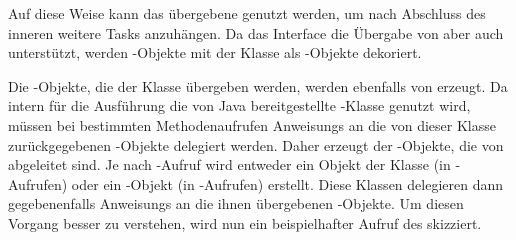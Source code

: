 Auf diese Weise kann das übergebene \classCompletableFuture{} genutzt werden, um nach Abschluss des inneren \classCallable{} weitere Tasks anzuhängen.
Da das Interface \classExecutorService{} die Übergabe von \classRunnable{} aber auch \classCallable{} unterstützt, werden \classRunnable{}-Objekte mit der Klasse \classRunnableCallable{} als \classCallable{}-Objekte dekoriert.  

Die \classCompletableFuture{}-Objekte, die der Klasse \classCompletingCallable{} übergeben werden, werden ebenfalls von \classCompletableFutureWrapper{} erzeugt. Da intern für die Ausführung die von Java bereitgestellte \classScheduledThreadPoolExecutor{}-Klasse genutzt wird, müssen bei bestimmten Methodenaufrufen \glspl{Anweisung} an die von dieser Klasse zurückgegebenen \classFuture{}-Objekte delegiert werden. Daher erzeugt der 
\classCompletableFutureWrapper{}-Objekte, die von \classCompletableFuture{} abgeleitet sind. Je nach \classExecutor{}-Aufruf wird entweder ein Objekt der Klasse \classDelegatingCompletableFuture{} (in -Aufrufen) oder ein \classDelegatingScheduledCompletableFuture{}-Objekt (in -Aufrufen) erstellt. Diese Klassen delegieren dann gegebenenfalls \glspl{Anweisung} an die ihnen übergebenen \classFuture{}-Objekte. Um diesen Vorgang besser zu verstehen, wird nun ein beispielhafter Aufruf des \classBlocklibExecutor{} skizziert.

